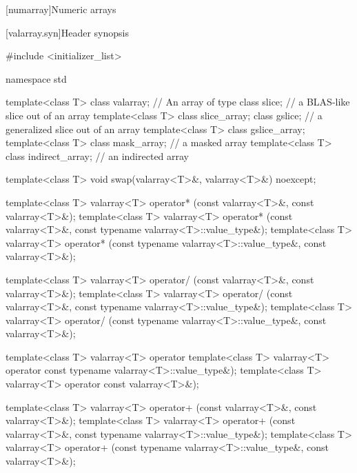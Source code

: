 


[numarray]{Numeric arrays}

[valarray.syn]{Header  synopsis}
%
\begin{codeblock}
#include <initializer_list>

namespace std {
  template<class T> class valarray;         // An array of type 
  class slice;                              // a BLAS-like slice out of an array
  template<class T> class slice_array;
  class gslice;                             // a generalized slice out of an array
  template<class T> class gslice_array;
  template<class T> class mask_array;       // a masked array
  template<class T> class indirect_array;   // an indirected array

  template<class T> void swap(valarray<T>&, valarray<T>&) noexcept;

  template<class T> valarray<T> operator* (const valarray<T>&, const valarray<T>&);
  template<class T> valarray<T> operator* (const valarray<T>&,
                                           const typename valarray<T>::value_type&);
  template<class T> valarray<T> operator* (const typename valarray<T>::value_type&,
                                           const valarray<T>&);

  template<class T> valarray<T> operator/ (const valarray<T>&, const valarray<T>&);
  template<class T> valarray<T> operator/ (const valarray<T>&,
                                           const typename valarray<T>::value_type&);
  template<class T> valarray<T> operator/ (const typename valarray<T>::value_type&,
                                           const valarray<T>&);

  template<class T> valarray<T> operator%
  template<class T> valarray<T> operator%
                                           const typename valarray<T>::value_type&);
  template<class T> valarray<T> operator%
                                           const valarray<T>&);

  template<class T> valarray<T> operator+ (const valarray<T>&, const valarray<T>&);
  template<class T> valarray<T> operator+ (const valarray<T>&,
                                           const typename valarray<T>::value_type&);
  template<class T> valarray<T> operator+ (const typename valarray<T>::value_type&,
                                           const valarray<T>&);

}
\end{codeblock}
